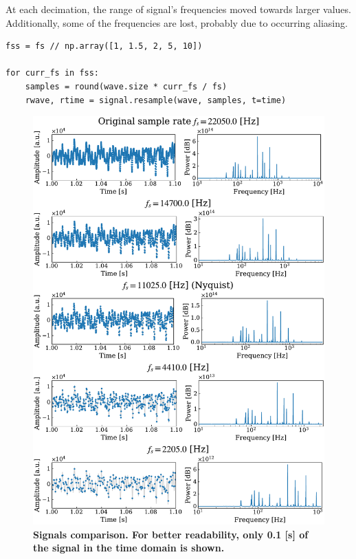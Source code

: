 \documentclass[13pt,a4paper]{article}
\begin{document}
At each decimation, the range of signal's frequencies moved towards larger values. Additionally, some of the frequencies are lost, probably due to occurring aliasing.

\begin{lstlisting}[caption={\textbf{Code snippet for gradual decimation of the signal.}}]
fss = fs // np.array([1, 1.5, 2, 5, 10])

for curr_fs in fss:
    samples = round(wave.size * curr_fs / fs)
    rwave, rtime = signal.resample(wave, samples, t=time)
\end{lstlisting}

\begin{figure}[ht!]
    \centering
    \includegraphics[width=\linewidth]{sampling_thorem.pdf}
    \caption{\textbf{Signals comparison. For better readability, only 0.1 [s] of the signal in the time domain is shown.}}
    \label{fig:sampling_thorem}
\end{figure}
\clearpage
\end{document}
